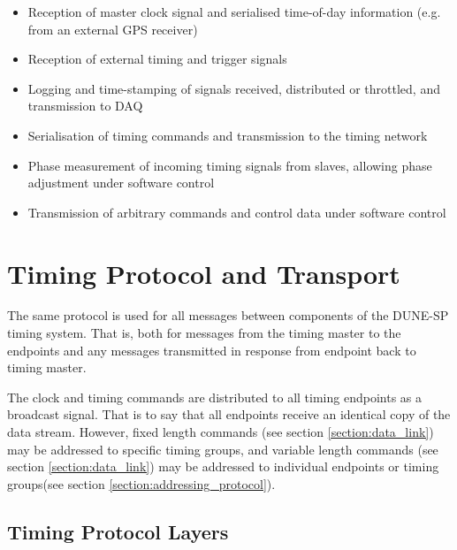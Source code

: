 \documentclass{dune}
\begin{document}
\begin{itemize}
	\item Reception of master clock signal and serialised time-of-day information (e.g. from an external GPS receiver)
	\item Reception of external timing and trigger signals
	\item Logging and time-stamping of signals received, distributed or throttled, and transmission to DAQ
	\item Serialisation of timing commands and transmission to the timing network
	\item Phase measurement of incoming timing signals from slaves, allowing phase adjustment under software control
	\item Transmission of arbitrary commands and control data under software control
\end{itemize}

%



\section{Timing Protocol and Transport}

The same protocol is used for all messages between components of the DUNE-SP timing system. That is, both for messages from the timing master to the endpoints and any messages transmitted in response from endpoint back to timing master.

The clock and timing commands are distributed to all timing endpoints as a broadcast signal. That is to say that all endpoints receive an identical copy of the data stream. However, fixed length commands (see section \ref{section:data_link}) may be addressed to specific timing groups, and variable length commands (see section \ref{section:data_link})  may be addressed to individual endpoints or timing groups(see section \ref{section:addressing_protocol}).


\subsection{Timing Protocol Layers}
\end{document}
